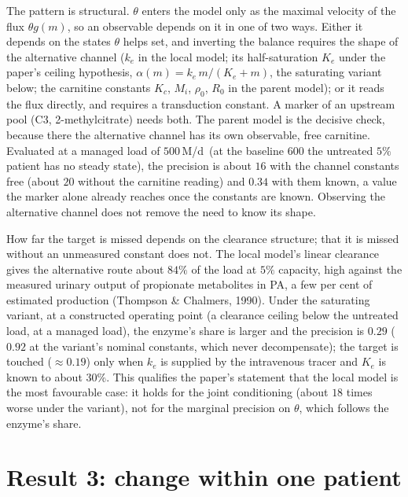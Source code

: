 \documentclass[11pt,a4paper]{article}
\newcommand{\um}{\,\textmu M/d}
\begin{document}
The pattern is structural. $\theta$ enters the model only as the maximal velocity of the
flux $\theta g(m)$, so an observable depends on it in one of two ways. Either it depends on
the states $\theta$ helps set, and inverting the balance requires the shape of the
alternative channel ($k_e$ in the local model; its half-saturation $K_e$ under the paper's ceiling hypothesis,
$\alpha(m)=k_e\,m/(K_e+m)$, the saturating variant below; the carnitine constants $K_c$, $M_i$, $\rho_0$, $R_0$ in the parent model); or it reads
the flux directly, and requires a transduction constant. A marker of an upstream pool (C3,
2-methylcitrate) needs both. The parent model is the decisive check, because there the
alternative channel has its own observable, free carnitine. Evaluated at a managed load of
$500$\um\ (at the baseline $600$ the untreated $5\%$ patient has no steady state), the
precision is about $16$ with the channel constants free (about $20$ without the carnitine
reading) and $0.34$ with them known, a value the marker alone already reaches once the
constants are known. Observing the alternative channel does not remove the need to know its
shape.

How far the target is missed depends on the clearance structure; that it is missed without an
unmeasured constant does not.
The local model's linear clearance gives the alternative route about $84\%$ of the load at
$5\%$ capacity, high against the measured urinary output of propionate metabolites in PA,
a few per cent of estimated production (Thompson \& Chalmers, 1990). Under the
saturating variant, at a constructed operating point (a clearance ceiling below the
untreated load, at a managed load), the enzyme's share is larger and the precision is $0.29$
($0.92$ at the variant's nominal constants, which never decompensate); the target is touched
($\approx0.19$) only when $k_e$ is supplied by the intravenous tracer and $K_e$ is known to
about $30\%$. This qualifies the paper's statement that the local model is the most
favourable case: it holds for the joint conditioning (about $18$ times worse under the
variant), not for the marginal precision on $\theta$, which follows the enzyme's share.

\section{Result 3: change within one patient}
\end{document}

